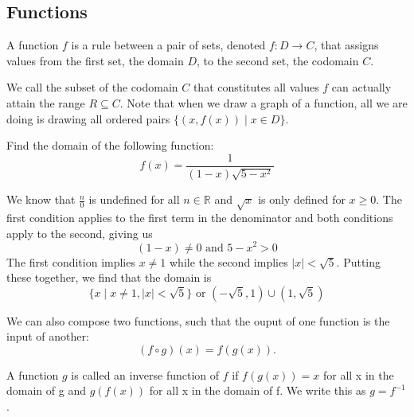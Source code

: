 \subsection{Functions}
\begin{definition}
    A function $f$ is a rule between a pair of sets, denoted $f: D \to C$, that assigns values from the first set, the domain $D$, to the second set, the codomain $C$.
\end{definition}

We call the subset of the codomain $C$ that constitutes all values $f$ can actually attain the range $R \subseteq C$. 
Note that when we draw a graph of a function, all we are doing is drawing all ordered pairs $\{(x, f(x)) \mid x \in D\}$.

\begin{example}
    Find the domain of the following function:
    \begin{equation*}
        f(x) = \frac{1}{(1 - x)\sqrt{5 - x^2}}
    \end{equation*}
\end{example}

\begin{answer}
    We know that $\frac{n}{0}$ is undefined for all $n \in \mathbb{R}$ and $\sqrt{x}$ is only defined for $x \geq 0$. 
    The first condition applies to the first term in the denominator and both conditions apply to the second, giving us
    \begin{equation*}
        (1 - x) \neq 0 \text{ and } 5 - x^2 > 0
    \end{equation*}
    The first condition implies $x \neq 1$ while the second implies $|x| < \sqrt{5}$.
    Putting these together, we find that the domain is
    \begin{equation*}
        \{x \mid x \neq 1, |x| < \sqrt{5}\} \text{ or } (-\sqrt{5}, 1) \cup (1, \sqrt{5})
    \end{equation*}
\end{answer}

We can also compose two functions, such that the ouput of one function is the input of another: 
\begin{equation*}
    (f \circ g)(x) = f(g(x)).
\end{equation*}

\begin{definition}
    A function $g$ is called an inverse function of $f$ if $f(g(x)) = x$ for all x in the domain of g and $g(f(x))$ for all x in the domain of f. 
    We write this as $g = f^{-1}$.
\end{definition}

